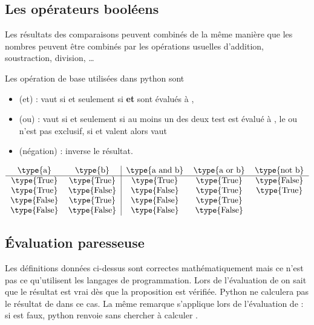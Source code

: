 \subsection{Les opérateurs booléens}
Les résultats des comparaisons peuvent combinés de la même manière que les nombres peuvent être combinés par les opérations usuelles d'addition, soustraction, division, \dots

Les opération de base utilisées dans python sont
\begin{itemize}
\item {} (et) :  vaut  si et seulement si  {\bf et}  sont évalués à ,
\item {} (ou) :  vaut  si et seulement si au moins un des deux test est évalué à , le ou n'est pas exclusif, si  et  valent  alors  vaut 
\item {} (négation) : inverse le résultat.
\end{itemize}
\[\begin{tabular}{cc|ccc}
\type{a} & \type{b} & \type{a and b} & \type{a or b} & \type{not b}\\
\hline
\type{True} & \type{True} & \type{True} & \type{True}  & \type{False} \\
\type{True} & \type{False} & \type{False} &\type{True}  & \type{True}\\
\type{False} & \type{True} & \type{False} &\type{True} \\
\type{False} & \type{False} & \type{False} & \type{False} \\
\end{tabular}\]
\subsection{Évaluation paresseuse}

Les définitions données ci-dessus sont correctes mathématiquement mais ce n'est pas ce qu'utilisent les langages de programmation.
Lors de l'évaluation de  on sait que le résultat est vrai dès que la proposition  est vérifiée. Python ne calculera pas le résultat de  dans ce cas. La même remarque s'applique lors de l'évaluation de  : si  est faux, python renvoie  sans chercher à calculer .

